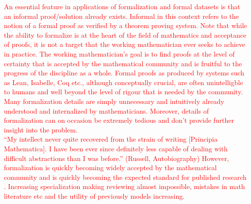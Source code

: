 \textcolor{red}{
An essential feature in applications of formalization and formal datasets is that an informal proof/solution already exists. Informal in this context refers to the notion of a formal proof as verified by a theorem proving system. Note that while the ability to formalize is at the heart of the field of mathematics and acceptance of proofs,
it is not a target that the working mathematician ever seeks to achieve in practice. The working mathematician's goal is to find proofs at the level of certainty that is accepted by the mathematical community and is fruitful to the progress of the discipline as a whole. Formal proofs as produced by systems such as Lean, Isabelle, Coq etc., although conceptually crucial, are often unintelligble to humans and well beyond the level of rigour that is needed by the community. Many formalization details are simply unnecessary and
intuitively already understood and internalized by mathematicians. Moreover, details of formalization can on occasion be extremely tedious and don't provide further insight into the problem.
\\
“My intellect never quite recovered from the strain of
writing [Principia Mathematica]. I have been ever since
definitely less capable of dealing with difficult
abstractions than I was before.” (Russell, Autobiography)
However, formalization is quickly becoming widely accepted by the mathematical community and is quickly becoming the expected standard for published research \cite{Tao, formalization_projects_to_check_shit}.
Increasing specialization making reviewing almost impossible, mistakes in math literature etc and the utility of previously models increasing.
}

